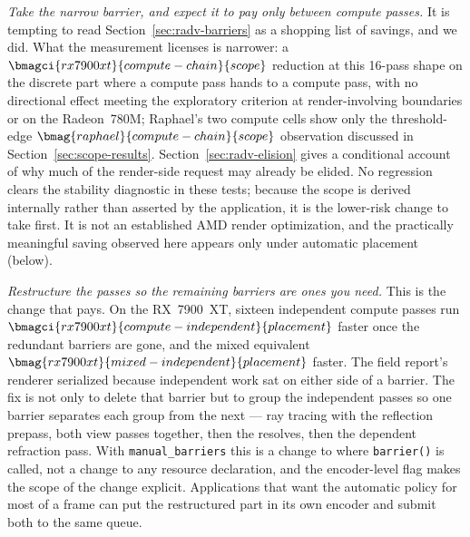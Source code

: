 \documentclass[10pt,twocolumn]{article}
\begin{document}
\emph{Take the narrow barrier, and expect it to pay only between compute
passes.} It is tempting to read Section~\ref{sec:radv-barriers} as a shopping
list of savings, and we did. What the measurement licenses is narrower: a
$\bmagci{rx7900xt}{compute-chain}{scope}$ reduction at this 16-pass shape on
the discrete part where a compute pass hands to a compute pass,
with no directional effect meeting the exploratory criterion at
render-involving boundaries or on the Radeon~780M; Raphael's two compute cells
show only the threshold-edge
$\bmag{raphael}{compute-chain}{scope}$ observation discussed in
Section~\ref{sec:scope-results}. Section~\ref{sec:radv-elision} gives a
conditional account of why much of the render-side request may already be
elided. No regression clears the stability diagnostic in these tests; because
the scope is derived internally rather than asserted by the application, it is
the lower-risk change to take first. It is not an established AMD render
optimization, and the practically meaningful saving observed here appears
only under automatic placement (below).

\emph{Restructure the passes so the remaining barriers are ones you need.}
This is the change that pays. On the RX~7900~XT, sixteen independent compute
passes run $\bmagci{rx7900xt}{compute-independent}{placement}$ faster once the
redundant barriers are gone, and the mixed equivalent
$\bmag{rx7900xt}{mixed-independent}{placement}$ faster. The field report's
renderer serialized because independent work sat on either side of a barrier.
The fix is not only to delete that barrier but to group the independent passes
so one barrier separates each group from the next --- ray tracing with the
reflection prepass, both view passes together, then the resolves, then the
dependent refraction pass. With \texttt{manual\_barriers} this is a change to
where \texttt{barrier()} is called, not a change to any resource declaration,
and the encoder-level flag makes the scope of the change explicit. Applications
that want the automatic policy for most of a frame can put the restructured
part in its own encoder and submit both to the same queue.
\end{document}
